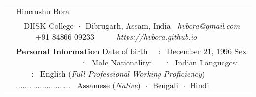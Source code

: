 \documentclass[a4paper, 11pt]{article}
\newenvironment{SectionTable}[1]{
	\renewcommand*{\arraystretch}{1.7}
	\setlength{\tabcolsep}{10pt}
	\begin{longtable}{Rp{5.2in}} & #1 \\}
{\end{longtable}\vspace{-.3cm}}
\begin{document}

\begin{SectionTable}{\Huge \color{Peach} Himanshu Bora}
& 
\faMapMarker \ \ DHSK College $\;\boldsymbol{\cdot}\;$ Dibrugarh, Assam, India \newline
\faEnvelopeO \  \textit{hvbora@gmail.com} \ \ \ \  \faPhone \ +91 84866 09233 \ \ \ \ \faGlobe \ \textit{https://hvbora.github.io} \\

&
{\textbf {Personal Information}} \newline
Date of birth \ \ : \ December 21, 1996 \newline
Sex \ \ \ \ \ \ \ \ \ \ \ \ \ \ \ \ \ : \ Male \newline
Nationality: \ \ \ : \ Indian \newline
Languages: \ \ \ \ : \ English (\textit{Full Professional Working Proficiency}) \newline 
{\color{white} .........................} \ Assamese (\textit{Native}) $\;\boldsymbol{\cdot}\;$ Bengali $\;\boldsymbol{\cdot}\;$ Hindi 
\end{SectionTable}
\end{document}
